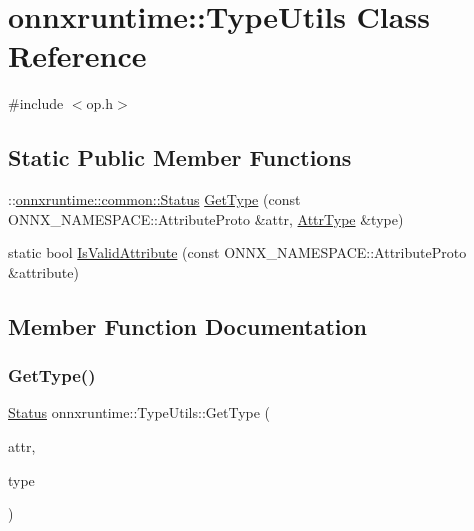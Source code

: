 \hypertarget{classonnxruntime_1_1TypeUtils}{}\section{onnxruntime\+:\+:Type\+Utils Class Reference}
\label{classonnxruntime_1_1TypeUtils}


{\ttfamily \#include $<$op.\+h$>$}

\subsection*{Static Public Member Functions}
\begin{DoxyCompactItemize}
\item 
\+::\mbox{\hyperlink{classonnxruntime_1_1common_1_1Status}{onnxruntime\+::common\+::\+Status}} \mbox{\hyperlink{classonnxruntime_1_1TypeUtils_ab038b77b22e143aba495e65349282ccf}{Get\+Type}} (const O\+N\+N\+X\+\_\+\+N\+A\+M\+E\+S\+P\+A\+C\+E\+::\+Attribute\+Proto \&attr, \mbox{\hyperlink{namespaceonnxruntime_afb993460ae8432beef9db5f0cf10ca7c}{Attr\+Type}} \&type)
\item 
static bool \mbox{\hyperlink{classonnxruntime_1_1TypeUtils_a0e9e122537934c76e1f9f8799a4909e4}{Is\+Valid\+Attribute}} (const O\+N\+N\+X\+\_\+\+N\+A\+M\+E\+S\+P\+A\+C\+E\+::\+Attribute\+Proto \&attribute)
\end{DoxyCompactItemize}


\subsection{Member Function Documentation}
\mbox{\label{classonnxruntime_1_1TypeUtils_ab038b77b22e143aba495e65349282ccf}} 
\subsubsection{\texorpdfstring{Get\+Type()}{GetType()}}
{\footnotesize\ttfamily \mbox{\hyperlink{classonnxruntime_1_1common_1_1Status}{Status}} onnxruntime\+::\+Type\+Utils\+::\+Get\+Type (\begin{DoxyParamCaption}\item[{const O\+N\+N\+X\+\_\+\+N\+A\+M\+E\+S\+P\+A\+C\+E\+::\+Attribute\+Proto \&}]{attr,  }\item[{\mbox{\hyperlink{namespaceonnxruntime_afb993460ae8432beef9db5f0cf10ca7c}{Attr\+Type}} \&}]{type }\end{DoxyParamCaption})\hspace{0.3cm}{\ttfamily [static]}}

